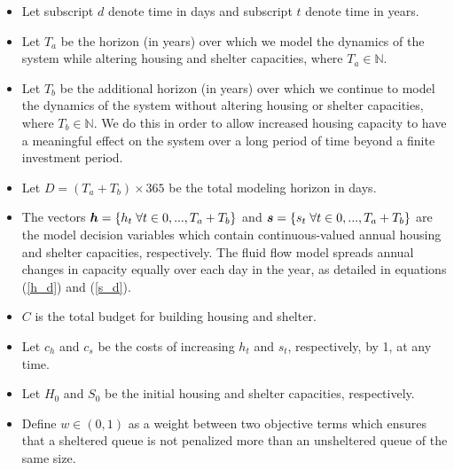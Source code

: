 \documentclass[12pt,a4paper]{article}
\begin{document}
\begin{itemize}
\item Let subscript $d$ denote time in days and subscript $t$ denote time in years.
\item Let $T_a$ be the horizon (in years) over which we model the dynamics of the system while altering housing and shelter capacities, where $T_a \in \mathbb{N}$. %
\item Let $T_b$ be the additional horizon (in years) over which we continue to model the dynamics of the system without altering housing or shelter capacities, where $T_b \in \mathbb{N}$. We do this in order to allow increased housing capacity to have a meaningful effect on the system over a long period of time beyond a finite investment period. %
\item Let $D=(T_a+T_b)\times365$ be the total modeling horizon in days.
\item The vectors $\boldsymbol{h} = \{h_t \hspace{0.1cm} \forall t \in 0,...,T_a+T_b\}$ and $\boldsymbol{s} = \{s_t \hspace{0.1cm} \forall t \in 0,...,T_a+T_b\}$ are the model decision variables which contain continuous-valued annual housing and shelter capacities, respectively. The fluid flow model spreads annual changes in capacity equally over each day in the year, as detailed in equations (\ref{h_d}) and (\ref{s_d}).
\item $C$ is the total budget for building housing and shelter. \par
\item Let $c_h$ and $c_s$ be the costs of increasing $h_t$ and $s_t$, respectively, by 1, at any time.
\item Let $H_0$ and $S_0$ be the initial housing and shelter capacities, respectively.
\item Define $w \in (0,1)$ as a weight between two objective terms which ensures that a sheltered queue is not penalized more than an unsheltered queue of the same size.
\end{itemize}
\end{document}
